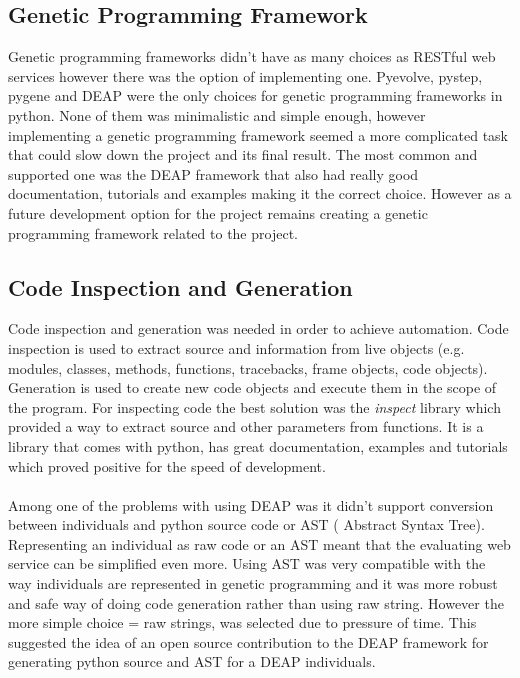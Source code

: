 \subsection{Genetic Programming Framework}
Genetic programming frameworks didn't have as many choices as RESTful web services however there was the option of implementing one.  Pyevolve\cite{pyevolve}, pystep\cite{pystep}, pygene\cite{pygene} and DEAP\cite{deap} were 
the only choices for genetic programming frameworks in python. None of them was minimalistic and simple enough, however implementing a genetic programming framework seemed a more complicated task
that could slow down the project and its final result. The most common and supported one was
the DEAP framework that also had really good documentation, tutorials and examples making it the correct choice. However as a future development option for the project
remains creating a genetic programming framework related to the project.
\subsection{Code Inspection and Generation}
Code inspection and generation was needed in order to achieve automation. Code inspection is used to extract source and information from live objects (e.g. modules, classes, methods, functions, tracebacks, 
frame objects, code objects). Generation is used to create new code objects and execute them in the scope of the program.
For inspecting code the best solution was the \textit{inspect} library which provided a way to extract source and other parameters from functions. It is a library that comes with python, 
has great documentation, examples and tutorials which proved positive for the speed of development.
\paragraph{}
Among one of the problems with using DEAP was it didn't support conversion between individuals and python source code or AST ( Abstract Syntax Tree). Representing an individual as raw code or an AST meant that 
the evaluating web service can be simplified even more. Using AST was very compatible with the way individuals are represented in genetic programming and it was more
robust and safe way of doing code generation rather than using raw string. However the more simple choice = raw strings, was selected due to pressure of time.  This suggested the idea of an open source contribution to the DEAP framework
 for generating python source 
and AST for a DEAP individuals.
